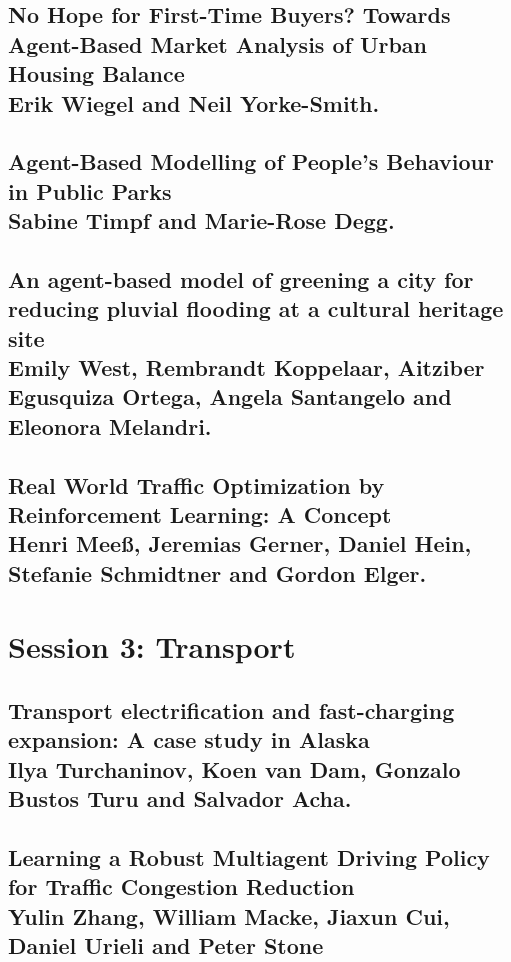 \documentclass[a4paper,11pt]{article}
\begin{document}
\subsection{No Hope for First-Time Buyers? Towards Agent-Based Market Analysis of Urban Housing Balance \\ Erik Wiegel and Neil Yorke-Smith. }
 
 
 \subsection{Agent-Based Modelling of People's Behaviour in Public Parks \\ Sabine Timpf and Marie-Rose Degg. }
 
 
 \subsection{An agent-based model of greening a city for reducing pluvial flooding at a cultural heritage site \\ Emily West, Rembrandt Koppelaar, Aitziber Egusquiza Ortega, Angela Santangelo and Eleonora Melandri.}
 
 
 \subsection{Real World Traffic Optimization by Reinforcement Learning: A Concept \\ Henri Meeß, Jeremias Gerner, Daniel Hein, Stefanie Schmidtner and Gordon Elger. }
 

\section{Session 3: Transport}

\subsection{Transport electrification and fast-charging expansion: A case study in Alaska \\ Ilya Turchaninov, Koen van Dam, Gonzalo Bustos Turu and Salvador Acha.}
 
 
 \subsection{Learning a Robust Multiagent Driving Policy for Traffic Congestion Reduction \\ Yulin Zhang, William Macke, Jiaxun Cui, Daniel Urieli and Peter Stone}
 
 
\end{document}
